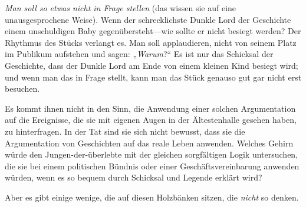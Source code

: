 \emph{Man soll so etwas nicht in Frage stellen} (das wissen sie auf eine unausgesprochene Weise). Wenn der schrecklichste Dunkle Lord der Geschichte einem unschuldigen Baby gegenübersteht—wie sollte er nicht besiegt werden? Der Rhythmus des Stücks verlangt es. Man soll applaudieren, nicht von seinem Platz im Publikum aufstehen und sagen: „\emph{Warum}?“ Es ist nur das Schicksal der Geschichte, dass der Dunkle Lord am Ende von einem kleinen Kind besiegt wird; und wenn man das in Frage stellt, kann man das Stück genauso gut gar nicht erst besuchen.

Es kommt ihnen nicht in den Sinn, die Anwendung einer solchen Argumentation auf die Ereignisse, die sie mit eigenen Augen in der Ältestenhalle gesehen haben, zu hinterfragen. In der Tat sind sie sich nicht bewusst, dass sie die Argumentation von Geschichten auf das reale Leben anwenden. Welches Gehirn würde den Jungen-der-überlebte mit der gleichen sorgfältigen Logik untersuchen, die sie bei einem politischen Bündnis oder einer Geschäftsvereinbarung anwenden würden, wenn es so bequem durch Schicksal und Legende erklärt wird?

Aber es gibt einige wenige, die auf diesen Holzbänken sitzen, die \emph{nicht} so denken.

